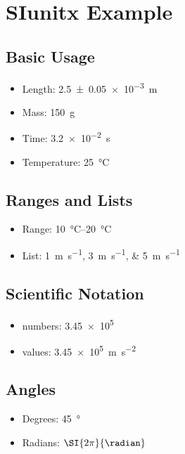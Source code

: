 \section{SIunitx Example}\label{sec:siunitx}

\subsection{Basic Usage}

\begin{itemize}
    \item Length: \SI{2.5(0.050)e-3}{\meter}
    \item Mass: \SI{150}{\gram}
    \item Time: \SI{3.2e-2}{\second}
    \item Temperature: \SI{25}{\degreeCelsius}
\end{itemize}

\subsection{Ranges and Lists}

\begin{itemize}
    \item Range: \SIrange{10}{20}{\degreeCelsius}
    \item List: \SIlist{1;3;5}{\meter\per\second}
\end{itemize}

\subsection{Scientific Notation}

\begin{itemize}
    \item numbers: \num{3.45e5}
    \item values: \SI{3.45e5}{\meter\per\second\squared}
\end{itemize}

\subsection{Angles}

\begin{itemize}
    \item Degrees: \SI{45}{\degree}
    \item Radians: $\SI{2\pi}{\radian}$
\end{itemize}
